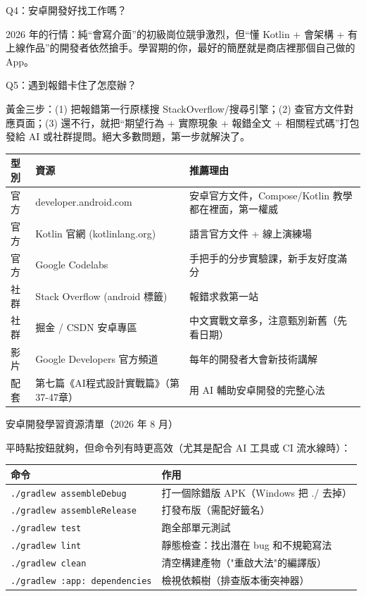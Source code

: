 Q4：安卓開發好找工作嗎？

2026 年的行情：純“會寫介面”的初級崗位競爭激烈，但“懂 Kotlin + 會架構 + 有上線作品”的開發者依然搶手。學習期的你，最好的簡歷就是商店裡那個自己做的 App。

Q5：遇到報錯卡住了怎麼辦？

黃金三步：(1) 把報錯第一行原樣搜 StackOverflow/搜尋引擎；(2) 查官方文件對應頁面；(3) 還不行，就把“期望行為 + 實際現象 + 報錯全文 + 相關程式碼”打包發給 AI 或社群提問。絕大多數問題，第一步就解決了。


\begin{center}
\begin{tabularx}{\linewidth}{|X|X|X|}
\hline
\textbf{型別} & \textbf{資源} & \textbf{推薦理由} \tabularnewline
\hline
官方 & developer.android.com & 安卓官方文件，Compose/Kotlin 教學都在裡面，第一權威 \tabularnewline
官方 & Kotlin 官網 (kotlinlang.org) & 語言官方文件 + 線上演練場 \tabularnewline
官方 & Google Codelabs & 手把手的分步實驗課，新手友好度滿分 \tabularnewline
社群 & Stack Overflow (android 標籤) & 報錯求救第一站 \tabularnewline
社群 & 掘金 / CSDN 安卓專區 & 中文實戰文章多，注意甄別新舊（先看日期） \tabularnewline
影片 & Google Developers 官方頻道 & 每年的開發者大會新技術講解 \tabularnewline
配套 & 第七篇《AI程式設計實戰篇》（第37-47章） & 用 AI 輔助安卓開發的完整心法 \tabularnewline
\hline
\end{tabularx}
\end{center}

\begin{center}\small\color{gray}安卓開發學習資源清單（2026 年 8 月）\end{center}


平時點按鈕就夠，但命令列有時更高效（尤其是配合 AI 工具或 CI 流水線時）：

\begin{center}
\begin{tabularx}{\linewidth}{|X|X|}
\hline
\textbf{命令} & \textbf{作用} \tabularnewline
\hline
\texttt{.\allowbreak /\allowbreak gradlew assembleDebug} & 打一個除錯版 APK（Windows 把 ./ 去掉） \tabularnewline
\texttt{.\allowbreak /\allowbreak gradlew assembleRelease} & 打發布版（需配好籤名） \tabularnewline
\texttt{.\allowbreak /\allowbreak gradlew test} & 跑全部單元測試 \tabularnewline
\texttt{.\allowbreak /\allowbreak gradlew lint} & 靜態檢查：找出潛在 bug 和不規範寫法 \tabularnewline
\texttt{.\allowbreak /\allowbreak gradlew clean} & 清空構建產物（"重啟大法"的編譯版） \tabularnewline
\texttt{.\allowbreak /\allowbreak gradlew :app: dependencies} & 檢視依賴樹（排查版本衝突神器） \tabularnewline
\hline
\end{tabularx}
\end{center}

